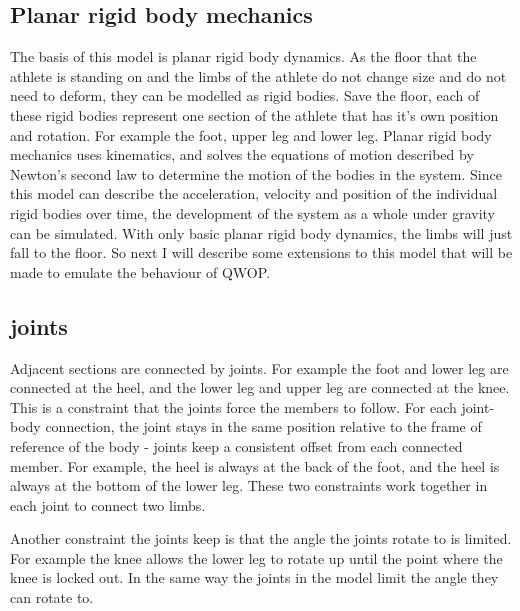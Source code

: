 \documentclass[12pt,a4paper,twoside,openright]{report}
\begin{document}
\subsection{Planar rigid body mechanics}
\label{prbm}

The basis of this model is planar rigid body dynamics.
As the floor that the athlete is standing on and the limbs of the athlete do not change size and do not need to deform, they can be modelled as rigid bodies.
Save the floor, each of these rigid bodies represent one section of the athlete that has it's own position and rotation. For example the foot, upper leg and lower leg.
Planar rigid body mechanics uses kinematics, and solves the equations of motion described by Newton's second law to determine the motion of the bodies in the system.
Since this model can describe the acceleration, velocity and position of the individual rigid bodies over time, the development of the system as a whole under gravity can be simulated.
With only basic planar rigid body dynamics, the limbs will just fall to the floor. So next I will describe some extensions to this model that will be made to emulate the behaviour of QWOP.

\subsection{joints}
\label{sub:joints}

Adjacent sections are connected by joints. For example the foot and lower leg are connected at the heel, and the lower leg and upper leg are connected at the knee.
This is a constraint that the joints force the members to follow. For each joint-body connection, the joint stays in the same position relative to the frame of reference of the body - joints keep a consistent offset from each connected member. For example, the heel is always at the back of the foot, and the heel is always at the bottom of the lower leg. These two constraints work together in each joint to connect two limbs.

Another constraint the joints keep is that the angle the joints rotate to is limited. For example the knee allows the lower leg to rotate up until the point where the knee is locked out. In the same way the joints in the model limit the angle they can rotate to.
\end{document}
